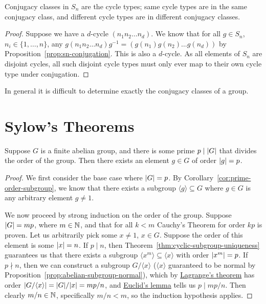 \begin{theorem}
    Conjugacy classes in \(S_n\) are the cycle types;
    same cycle types are in the same conjugacy class,
    and different cycle types are in different conjugacy classes.
\end{theorem}
\begin{proof}
    Suppose we have a \(d\)-cycle \((n_1 n_2 \hdots n_d)\).
    We know that for all \(g \in S_n\), \(n_i \in \{1,\hdots,n\}\),
    any \(g(n_1 n_2 \hdots n_d)g^{-1} = (g(n_1) g(n_2) \hdots g(n_d))\)
    by Proposition~\ref{prop:sn-conjugation}.
    This is also a \(d\)-cycle.
    As all elements of \(S_n\) are disjoint cycles,
    all such disjoint cycle types must only ever map to their own cycle type
    under conjugation.
\end{proof}
\begin{remark}
    In general it is difficult to determine
    exactly the conjugacy classes of a group.
\end{remark}


\section{Sylow's Theorems}

\begin{theorem}\label{thm:cauchy}
    Suppose \(G\) is a finite abelian group,
    and there is some prime \(p \mid \abs{G}\)
    that divides the order of the group.
    Then there exists an element \(g \in G\) of order \(\abs{g} = p\).
\end{theorem}
\begin{proof}
    We first consider the base case where \(\abs{G} = p\).
    By Corollary~\ref{cor:prime-order-subgroup},
    we know that there exists a subgroup \(\langle g \rangle \subseteq G\)
    where \(g \in G\) is any arbitrary element \(g \neq 1\).

    We now proceed by strong induction on the order of the group.
    Suppose \(\abs{G} = mp\), where \(m \in \mathbb{N}\),
    and that for all \(k < m\) Cauchy's Theorem for order \(kp\) is proven.
    Let us arbitrarily pick some \(x \neq 1\), \(x \in G\).
    Suppose the order of this element is some \(\abs{x} = n\).
    If \(p \mid n\), then Theorem~\ref{thm:cyclic-subgroup-uniqueness}
    guarantees us that there exists a subgroup
    \(\langle x^m \rangle \subseteq \langle x \rangle\)
    with order \(\abs{x^m} = p\).
    If \(p \nmid n\), then we can construct a subgroup \(G/\langle x \rangle\)
    (\(\langle x \rangle\) guaranteed to be normal
    by Proposition~\ref{prop:abelian-subgroup-normal}),
    which by \hyperref[thm:lagrange]{Lagrange's theorem}
    has order \(\abs{G/\langle x \rangle} = \abs{G}/\abs{x} = mp/n\),
    and \hyperref[lem:euclid]{Euclid's lemma} tells us \(p \mid mp/n\).
    Then clearly \(m/n \in \mathbb{N}\), specifically \(m/n < m\),
    so the induction hypothesis applies.
\end{proof}

